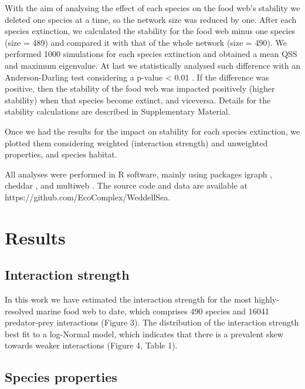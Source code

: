 \documentclass[gc, manuscript]{copernicus}
\begin{document}
With the aim of analysing the effect of each species on the food web's
stability we deleted one species at a time, so the network size was
reduced by one. After each species extinction, we calculated the
stability for the food web minus one species (size = 489) and compared
it with that of the whole network (size = 490). We performed 1000
simulations for each species extinction and obtained a mean QSS and
maximum eigenvalue. At last we statistically analysed such difference
with an Anderson-Darling test considering a p-value \textless{} 0.01
\citep{Scholz1987}. If the difference was positive, then the stability
of the food web was impacted positively (higher stability) when that
species become extinct, and viceversa. Details for the stability
calculations are described in Supplementary Material.

Once we had the results for the impact on stability for each species
extinction, we plotted them considering weighted (interaction strength)
and unweighted properties, and species habitat.

All analyses were performed in R software, mainly using packages igraph
\citep{Csardi2005}, cheddar \citep{Hudson2013}, and multiweb
\citep{Saravia2019}. The source code and data are available at
https://github.com/EcoComplex/WeddellSea.

\section{Results}

\subsection{Interaction strength}

In this work we have estimated the interaction strength for the most
highly-resolved marine food web to date, which comprises 490 species and
16041 predator-prey interactions (Figure 3). The distribution of the
interaction strength best fit to a log-Normal model, which indicates
that there is a prevalent skew towards weaker interactions (Figure 4,
Table 1).

\subsection{Species properties}
\end{document}
